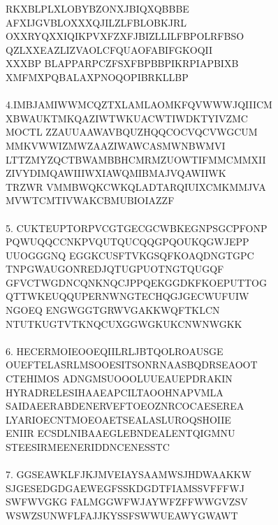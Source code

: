 \documentclass[letterpaper,10pt]{article}
\begin{document}
\begin{enumerate}
\begin{enumerate}
RKXBLPLXLOBYBZONXJBIQXQBBBE\\AFXIJGVBLOXXXQJILZLFBLOBKJRL
\\OXXRYQXXIQIKPVXFZXFJBIZLLILFBPOLRFBSO\\QZLXXEAZLIZVAOLCFQUAOFABIFGKOQII\\XXXBP
BLAPPARPCZFSXFBPBBPIKRPIAPBIXB\\XMFMXPQBALAXPNOQOPIBRKLLBP\\\\
4.IMBJAMIWWMCQZTXLAMLAOMKFQVWWWJQIIICM\\XBWAUKTMKQAZIWTWKUACWTIWDKTYIVZMC\\MOCTL
ZZAUUAAWAVBQUZHQQCOCVQCVWGCUM\\MMKVWWIZMWZAAZIWAWCASMWNBWMVI
\\LTTZMYZQCTBWAMBBHCMRMZUOWTIFMMCMMXII\\ZIVYDIMQAWIIIWXIAWQMIBMAJVQAWIIWK\\TRZWR
VMMBWQKCWKQLADTARQIUIXCMKMMJVA\\MVWTCMTIVWAKCBMUBIOIAZZF\\\\
5. 
CUKTEUPTORPVCGTGECGCWBKEGNPSGCPFONP\\PQWUQQCCNKPVQUTQUCQQGPQOUKQGWJEPP\\UUOGGGNQ
EGGKCUSFTVKGSQFKOAQDNGTGPC\\TNPGWAUGONREDJQTUGPUOTNGTQUGQF
\\GFVCTWGDNCQNKNQCJPPQEKGGDKFKOEPUTTOG\\QTTWKEUQQUPERNWNGTECHQGJGECWUFUIW\\NGOEQ
ENGWGGTGRWVGAKKWQFTKLCN\\NTUTKUGTVTKNQCUXGGWGKUKCNWNWGKK\\\\
6. 
HECERMOIEOOEQIILRLJBTQOLROAUSGE\\OUEFTELASRLMSOOESITSONRNAASBQDRSEAOOT\\CTEHIMOS
ADNGMSUOOOLUUEAUEPDRAKIN\\HYRADRELESIHAAEAPCILTAOOHNAPVMLA
\\SAIDAEERABDENERVEFTOEOZNRCOCAESEREA\\LYARIOECNTMOEOAETSEALASLUROQSHOIIE\\ENIIR
ECSDLNIBAAEGLEBNDEALENTQIGMNU\\STEESIRMEENERIDDNCENESSTC\\\\
7. 
GGSEAWKLFJKJMVEIAYSAAMWSJHDWAAKKW\\SJGESEDGDGAEWEGFSSKDGDTFIAMSSVFFFWJ\\SWFWVGKG
FALMGGWFWJAYWFZFFWWGVZSV\\WSWZSUNWFLFAJJKYSSFSWWUEAWYGWAWT

\end{enumerate}
\end{enumerate}
\end{document}
